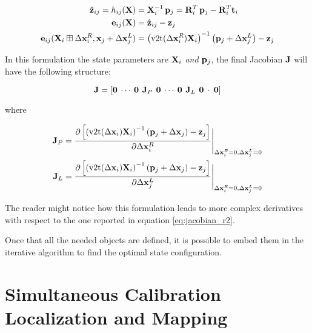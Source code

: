 \begin{align*}
    \pred_{ij} = h_{ij}(\SState) &= \SState_i^{-1} \, \p_j = \rot_{i}^T\,\p_j - \rot_{i}^T\trans_i \\
    \error_{ij}(\SState) &= \pred_{ij} - \meas_j \\
    \error_{ij}(\SState_i \boxplus \dx_i^R, \state_j + \dx_j^L) &= \left(\v2t(\dx_i^R)\SState_i\right)^{-1}\left(\p_j + \dx_j^L\right) - \meas_j
\end{align*}

In this formulation the state parameters are $\mathbf{X}_i$ \textit{and} $\mathbf{p}_j$, the final Jacobian $\mathbf{J}$ will have the following structure:

\begin{equation*}
    \mathbf{J} = \left[\mathbf{0} \: \cdots \: \mathbf{0} \:\, \mathbf{J}_P \,\: \mathbf{0} \: \cdots \: \mathbf{0} \:\, \mathbf{J}_L \,\: \mathbf{0} \: \cdot \: \mathbf{0}\right]
\end{equation*}

\noindent where 

\begin{align}
    \label{eq:jac_p_se2}
    \jacob_P &= \frac{\partial \left[\left(\v2t(\dx_i)\SState_i\right)^{-1}\left(\p_j + \dx_j\right) - \meas_j\right]}{\partial\dx_i^R}\Bigg \rvert_{\dx_i^R = 0, \dx_j^L = 0} \\
    \label{eq:jac_l_se2}
    \jacob_L &= \frac{\partial \left[\left(\v2t(\dx_i)\SState_i\right)^{-1}\left(\p_j + \dx_j\right) - \meas_j\right]}{\partial\dx_j^L}\Bigg \rvert_{\dx_i^R = 0, \dx_j^L = 0}
\end{align}

\noindent The reader might notice how this formulation leads to more complex derivatives with respect to the one reported in equation \ref{eq:jacobian_r2}.

\vspace{10px}

Once that all the needed objects are defined, it is possible to embed them in the iterative algorithm to find the optimal state configuration.

\section{Simultaneous Calibration Localization and Mapping}
\lipsum[1-2]